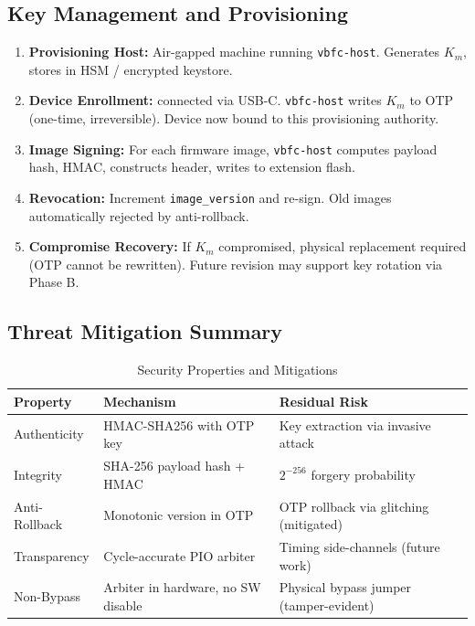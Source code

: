 \subsection{Key Management and Provisioning}
\begin{enumerate}
    \item \textbf{Provisioning Host:} Air-gapped machine running \texttt{vbfc-host}. Generates $K_m$, stores in HSM / encrypted keystore.
    \item \textbf{Device Enrollment:} \vbfc connected via USB-C. \texttt{vbfc-host} writes $K_m$ to \rp \ac{OTP} (one-time, irreversible). Device now bound to this provisioning authority.
    \item \textbf{Image Signing:} For each firmware image, \texttt{vbfc-host} computes payload hash, HMAC, constructs header, writes to extension flash.
    \item \textbf{Revocation:} Increment \texttt{image\_version} and re-sign. Old images automatically rejected by anti-rollback.
    \item \textbf{Compromise Recovery:} If $K_m$ compromised, physical \vbfc replacement required (OTP cannot be rewritten). Future revision may support key rotation via Phase B.
\end{enumerate}

\subsection{Threat Mitigation Summary}
\begin{table}[t]
\centering
\caption{Security Properties and Mitigations}
\label{tab:security_properties}
\begin{tabular}{@{}lll@{}}
\toprule
\textbf{Property} & \textbf{Mechanism} & \textbf{Residual Risk} \\
\midrule
Authenticity & HMAC-SHA256 with OTP key & Key extraction via invasive attack \\
Integrity & SHA-256 payload hash + HMAC & $2^{-256}$ forgery probability \\
Anti-Rollback & Monotonic version in OTP & OTP rollback via glitching (mitigated) \\
Transparency & Cycle-accurate PIO arbiter & Timing side-channels (future work) \\
Non-Bypass & Arbiter in hardware, no SW disable & Physical bypass jumper (tamper-evident) \\
\bottomrule
\end{tabular}
\end{table}